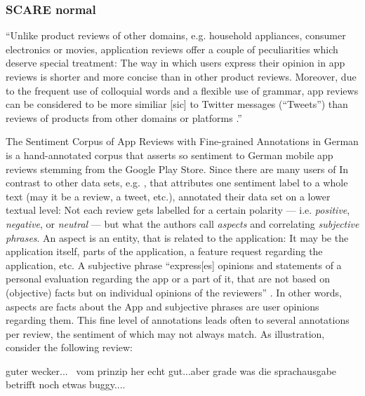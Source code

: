 \subsubsection{SCARE normal}

``Unlike product reviews of other domains, e.g. household appliances, consumer electronics or
movies, application reviews offer a couple of peculiarities which deserve special treatment:
The way in which users express their opinion in app reviews is shorter and more concise than in
other product reviews.
Moreover, due to the frequent use of colloquial words and a flexible use of grammar, app reviews
can be considered to be more similiar [sic] to Twitter messages (“Tweets”) than reviews of
products from other domains or platforms \textelp{}.'' \citep[p.~1114]{sanger2016scare}


The Sentiment Corpus of App Reviews with Fine-grained Annotations in German \cite{sanger2016scare}
is a hand-annotated corpus that asserts so sentiment to German mobile app reviews stemming from
the Google Play Store.
Since there are many users of
In contrast to other data sets, e.g. \citep{socher2013recursive, go2009twitter}, that attributes
one sentiment label to a whole text (may it be a review, a tweet, etc.), \cite{sanger2016scare}
annotated their data set on a lower textual level:
Not each review gets labelled for a certain polarity --- i.e. \emph{positive}, \emph{negative}, or
\emph{neutral} --- but what the authors call \emph{aspects} and correlating \emph{subjective
phrases}.
An aspect is an entity, that is related to the application:
It may be the application itself, parts of the application, a feature request regarding the
application, etc.
A subjective phrase ``express[es] opinions and statements of a personal evaluation regarding the
app or a part of it, that are not based on (objective) facts but on individual opinions of the
reviewers'' \citep[p.~1116]{sanger2016scare}.
In other words, aspects are facts about the App and subjective phrases are user opinions regarding
them.
This fine level of annotations leads often to several annotations per review, the sentiment of
which may not always match.
As illustration, consider the following review:

\begin{examples}
  \label{ex:fine-grained-anno}
  \item guter wecker... \textbar\textbar\ vom prinzip her echt gut...aber grade was die sprachausgabe betrifft noch etwas buggy....
\end{examples}

